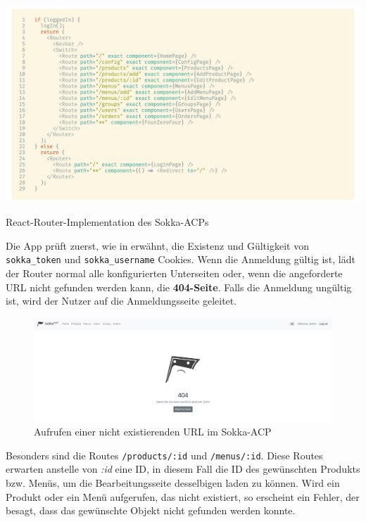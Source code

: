 \begin{code}[htp]
    \centering
    \includegraphics[width=1\textwidth]{images/ACP/routing.png}
    \vspace{-25pt}
    \caption{React-Router-Implementation des Sokka-ACPs}
\end{code}

\pagebreak

Die App prüft zuerst, wie in \textit{} erwähnt, die Existenz und Gültigkeit von \lstinline{sokka_token} und \lstinline{sokka_username} Cookies. Wenn die Anmeldung gültig ist, lädt der Router normal alle konfigurierten Unterseiten oder, wenn die angeforderte URL nicht gefunden werden kann, die \textbf{404-Seite}. Falls die Anmeldung ungültig ist, wird der Nutzer auf die Anmeldungsseite geleitet.

\begin{figure}[ht]
    \centering
    \includegraphics[width=1\textwidth]{images/ACP/404.png}
    \caption{Aufrufen einer nicht existierenden URL im Sokka-ACP}
\end{figure}

Besonders sind die Routes \lstinline{/products/:id} und \lstinline{/menus/:id}. Diese Routes erwarten anstelle von \textit{:id} eine ID, in diesem Fall die ID des gewünschten Produkts bzw. Menüs, um die Bearbeitungsseite desselbigen laden zu können. Wird ein Produkt oder ein Menü aufgerufen, das nicht existiert, so erscheint ein Fehler, der besagt, dass das gewünschte Objekt nicht gefunden werden konnte.